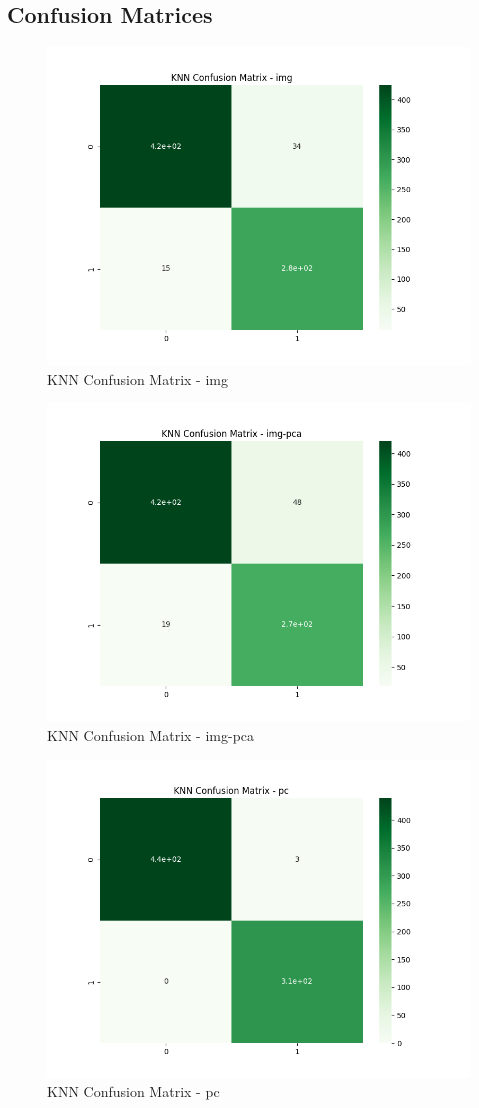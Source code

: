 \documentclass{article}
\begin{document}
\subsection{Confusion Matrices}

\begin{multicols}{2}
\footnotesize
\begin{figure}[H]
    \centering
    \includegraphics[width = .48\textwidth]{confusion/knn-confusion-img.png}
    \caption{KNN Confusion Matrix - img}
    \label{fig:enter-label}
\end{figure}

\begin{figure}[H]
    \centering
    \includegraphics[width = .48\textwidth]{confusion/knn-confusion-img-pca.png}
    \caption{KNN Confusion Matrix - img-pca}
    \label{fig:enter-label}
\end{figure}

\begin{figure}[H]
    \centering
    \includegraphics[width = .48\textwidth]{confusion/knn-confusion-pc.png}
    \caption{KNN Confusion Matrix - pc}
    \label{fig:enter-label}
\end{figure}


\end{multicols}
\end{document}
